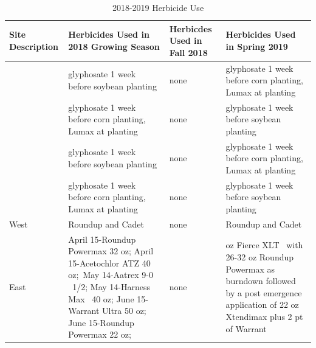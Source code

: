 \documentclass[
]{article}
\begin{document}
\begin{table}[H]

\caption{\label{tab:herbtable}2018-2019 Herbicide Use}
\centering
\begin{tabular}[t]{>{\centering\arraybackslash}p{8em}>{\centering\arraybackslash}p{8em}>{\centering\arraybackslash}p{8em}>{\centering\arraybackslash}p{8em}}
\toprule
Site Description & Herbicides Used in 2018 Growing Season & Herbicdes Used in Fall 2018 & Herbicides Used in Spring 2019\\
\midrule
\rowcolor{gray!6}   & glyphosate 1 week before soybean planting & none & glyphosate 1 week before corn planting, Lumax at planting\\

\multirow{-2}{8em}{\centering\arraybackslash Central Grain} & glyphosate 1 week before corn planting, Lumax at planting & none & glyphosate 1 week before soybean planting\\
\cmidrule{1-4}
\rowcolor{gray!6}   & glyphosate 1 week before soybean planting & none & glyphosate 1 week before corn planting, Lumax at planting\\

\multirow{-2}{8em}{\centering\arraybackslash Central Silage} & glyphosate 1 week before corn planting, Lumax at planting & none & glyphosate 1 week before soybean planting\\
\cmidrule{1-4}
\rowcolor{gray!6}  West & Roundup and Cadet & none & Roundup and Cadet\\
\cmidrule{1-4}
East & April 15-Roundup Powermax 32 oz; April 15-Acetochlor ATZ 40 oz; May 14-Aatrex 9-0   1/2; May 14-Harness Max  40 oz; June 15-Warrant Ultra 50 oz; June 15-Roundup Powermax 22 oz; & none & 3 oz Fierce XLT  with 26-32 oz Roundup Powermax as burndown followed by a post emergence application of 22 oz Xtendimax plus 2 pt of Warrant\\
\bottomrule
\end{tabular}
\end{table}

\newpage
\end{document}
